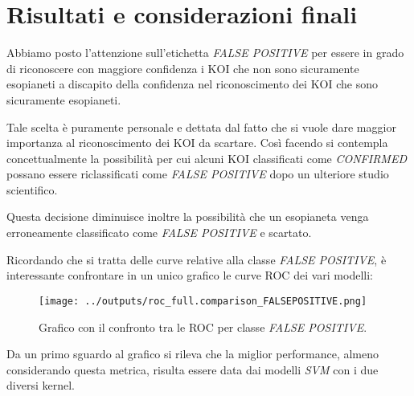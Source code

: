 \chapter{Risultati e considerazioni finali}
Abbiamo posto l'attenzione sull'etichetta \textit{FALSE POSITIVE}
per essere in grado di riconoscere con maggiore confidenza i KOI che 
non sono sicuramente esopianeti a discapito della confidenza nel 
riconoscimento dei KOI che sono sicuramente esopianeti. 

Tale scelta è puramente personale e dettata dal fatto che si 
vuole dare maggior importanza al riconoscimento dei KOI da scartare.
Così facendo si contempla concettualmente la possibilità per cui alcuni 
KOI classificati come \textit{CONFIRMED} possano essere riclassificati come 
\textit{FALSE POSITIVE} dopo un ulteriore studio scientifico.

Questa decisione diminuisce inoltre la possibilità che un esopianeta 
venga erroneamente classificato come \textit{FALSE POSITIVE} e scartato.

Ricordando che si tratta delle curve relative alla classe 
\textit{FALSE POSITIVE}, è interessante confrontare in un unico grafico le curve ROC dei 
vari modelli:
\begin{figure}[H]
    \centering
    \texttt{[image: ../outputs/roc\_full.comparison\_FALSEPOSITIVE.png]}
    \caption{Grafico con il confronto tra le ROC per classe \textit{FALSE POSITIVE}.}
\end{figure}


Da un primo sguardo al grafico si rileva che la miglior performance, almeno 
considerando questa metrica, risulta essere data dai modelli \textit{SVM} con
i due diversi kernel.

